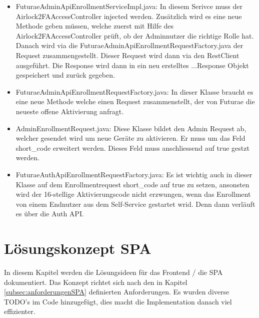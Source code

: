 \begin{itemize}
	\item FuturaeAdminApiEnrollmentServiceImpl.java: In diesem Serivce muss der\\ Airlock2FAAccessController injected werden. Zusätzlich wird es eine neue Methode geben müssen, welche zuerst mit Hilfe des Airlock2FAAccessController prüft, ob der Adminnutzer die richtige Rolle hat. Danach wird via die \flqq FuturaeAdminApiEnrollmentRequestFactory.java\frqq{} der Request zusammengestellt. Dieser Request wird dann via den RestClient ausgeführt. Die Response wird dann in ein neu erstelltes ...Response Objekt gespeichert und zurück gegeben.
	\item FuturaeAdminApiEnrollmentRequestFactory.java: In dieser Klasse braucht es eine neue Methode welche einen Request zusammenstellt, der von Futurae die neueste offene Aktivierung anfragt.
	\item AdminEnrollmentRequest.java: Diese Klasse bildet den Admin Request ab, welcher gesendet wird um neue Geräte zu aktivieren. Er muss um das Feld \flqq short\_code\frqq{} erweitert werden. Dieses Feld muss anschliessend auf true gestzt werden.
	\item FuturaeAuthApiEnrollmentRequestFactory.java: Es ist wichtig auch in dieser Klasse auf dem Enrollmentrequest \flqq short\_code\frqq{} auf true zu setzen, ansonsten wird der 16-stellige Aktivierungscode nicht erzwungen, wenn das Enrollment von einem Endnutzer aus dem Self-Service gestartet wrid. Denn dann verläuft es über die Auth API. 
\end{itemize}



\section{Lösungskonzept SPA}\label{sec:lk-spa}
In diesem Kapitel werden die Lösungsideen für das Frontend / die SPA dokumentiert.  Das Konzept richtet sich nach den in Kapitel \ref{subsec:anforderungenSPA} definierten Anforderungen. Es wurden diverse TODO's im Code hinzugefügt, dies macht die Implementation danach viel effizienter. 

